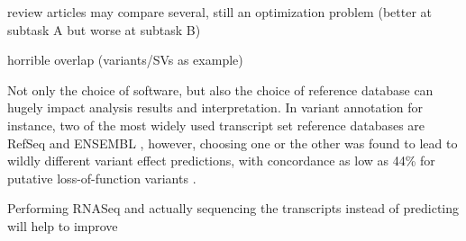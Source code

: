 review articles may compare several, still an optimization problem (better at subtask A but worse at subtask B)

horrible overlap (variants/SVs as example)

Not only the choice of software, but also the choice of reference database can hugely impact analysis results and interpretation. In variant annotation for instance, two of the most widely used transcript set reference databases are RefSeq \cite{} and ENSEMBL \cite{}, however, choosing one or the other was found to lead to wildly different variant effect predictions, with concordance as low as 44\% for putative loss-of-function variants \cite{mccarthy2014choice}.

Performing RNASeq and actually sequencing the transcripts instead of predicting will help to improve

